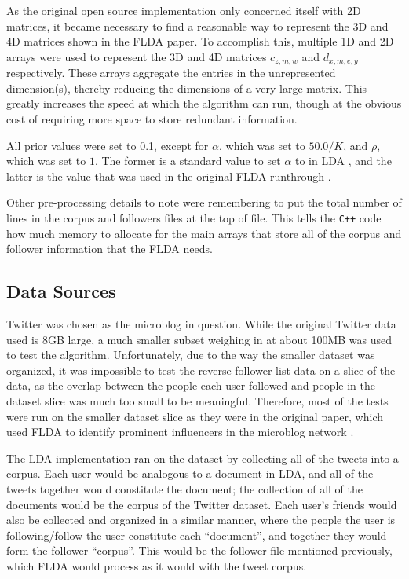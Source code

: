 \documentclass[a4paper]{article}
\begin{document}
As the original open source implementation only concerned itself with 2D matrices, it became necessary to find a reasonable way to represent the 3D and 4D matrices shown in the FLDA paper. To accomplish this, multiple 1D and 2D arrays were used to represent the 3D and 4D matrices $c_{z, m, w}$ and $d_{x, m, e, y}$ respectively. These arrays aggregate the entries in the unrepresented dimension(s), thereby reducing the dimensions of a very large matrix. This greatly increases the speed at which the algorithm can run, though at the obvious cost of requiring more space to store redundant information.

All prior values were set to 0.1, except for $\alpha$, which was set to $50.0 / K$, and $\rho$, which was set to $1$. The former is a standard value to set $\alpha$ to in LDA \cite{lda}, and the latter is the value that was used in the original FLDA runthrough \cite{flda}. 

Other pre-processing details to note were remembering to put the total number of lines in the corpus and followers files at the top of file. This tells the \verb!C++! code how much memory to allocate for the main arrays that store all of the corpus and follower information that the FLDA needs.

\subsection{Data Sources}\label{sec:data}
Twitter was chosen as the microblog in question. While the original Twitter data used is 8GB large, a much smaller subset weighing in at about 100MB was used to test the algorithm. Unfortunately, due to the way the smaller dataset was organized, it was impossible to test the reverse follower list data on a slice of the data, as the overlap between the people each user followed and people in the dataset slice was much too small to be meaningful. Therefore, most of the tests were run on the smaller dataset slice as they were in the original paper, which used FLDA to identify prominent influencers in the microblog network \cite{flda}.

The LDA implementation ran on the dataset by collecting all of the tweets into a corpus. Each user would be analogous to a document in LDA, and all of the tweets together would constitute the document; the collection of all of the documents would be the corpus of the Twitter dataset. Each user's friends would also be collected and organized in a similar manner, where the people the user is following/follow the user constitute each ``document'', and together they would form the follower ``corpus''. This would be the follower file mentioned previously, which FLDA would process as it would with the tweet corpus.
\end{document}
